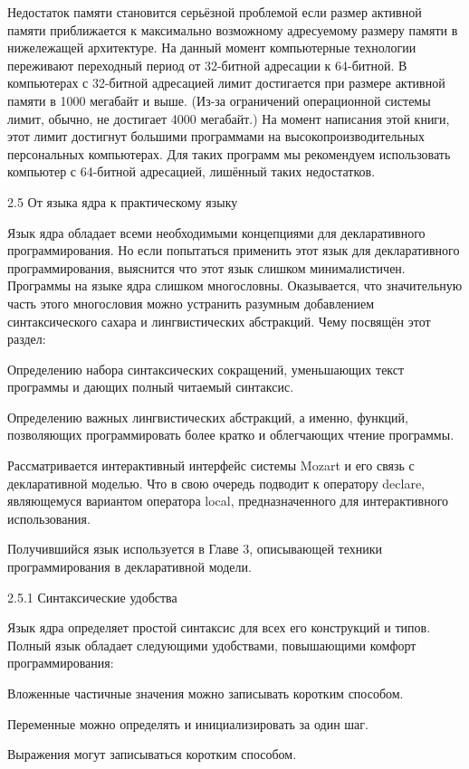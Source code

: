Недостаток памяти становится серьёзной проблемой если размер активной памяти приближается к максимально возможному адресуемому размеру памяти в нижележащей архитектуре. На данный момент компьютерные технологии переживают переходный период от 32-битной адресации к 64-битной. В компьютерах с 32-битной адресацией лимит достигается при размере активной памяти в 1000 мегабайт и выше. (Из-за ограничений операционной системы лимит, обычно, не достигает 4000 мегабайт.) На момент написания этой книги, этот лимит достигнут большими программами на высокопроизводительных персональных компьютерах. Для таких программ мы рекомендуем использовать компьютер с 64-битной адресацией, лишённый таких недостатков.

2.5 От языка ядра к практическому языку

Язык ядра обладает всеми необходимыми концепциями для декларативного программирования. Но если попытаться применить этот язык для декларативного программирования, выяснится что этот язык слишком минималистичен. Программы на языке ядра слишком многословны. Оказывается, что значительную часть этого многословия можно устранить разумным добавлением синтаксического сахара и лингвистических абстракций. Чему посвящён этот раздел:

Определению набора синтаксических сокращений, уменьшающих текст программы и дающих полный читаемый синтаксис.

Определению важных лингвистических абстракций, а именно, функций, позволяющих программировать более кратко и облегчающих чтение программы.

Рассматривается интерактивный интерфейс системы Mozart и его связь с декларативной моделью. Что в свою очередь подводит к оператору declare, являющемуся вариантом оператора local, предназначенного для интерактивного использования.

Получившийся язык используется в Главе 3, описывающей техники программирования в декларативной модели.

2.5.1 Синтаксические удобства

Язык ядра определяет простой синтаксис для всех его конструкций и типов. Полный язык обладает следующими удобствами, повышающими комфорт программирования:

Вложенные частичные значения можно записывать коротким способом.

Переменные можно определять и инициализировать за один шаг.

Выражения могут записываться коротким способом.

